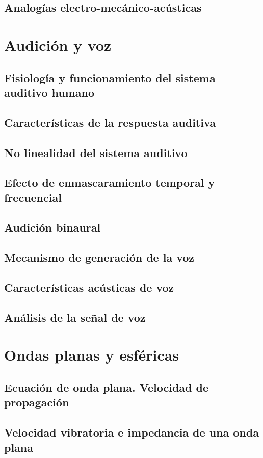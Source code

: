 \documentclass[a4paper]{book}
\begin{document}
\section{Analogías electro-mecánico-acústicas}

\chapter{Audición y voz}
\section{Fisiología y funcionamiento del sistema auditivo humano}
\section{Características de la respuesta auditiva}
\section{No linealidad del sistema auditivo}
\section{Efecto de enmascaramiento temporal y frecuencial}
\section{Audición binaural}
\section{Mecanismo de generación de la voz}
\section{Características acústicas de voz}
\section{Análisis de la señal de voz}

\chapter{Ondas planas y esféricas}
\section{Ecuación de onda plana. Velocidad de propagación}
\section{Velocidad vibratoria e impedancia de una onda plana}
\end{document}
